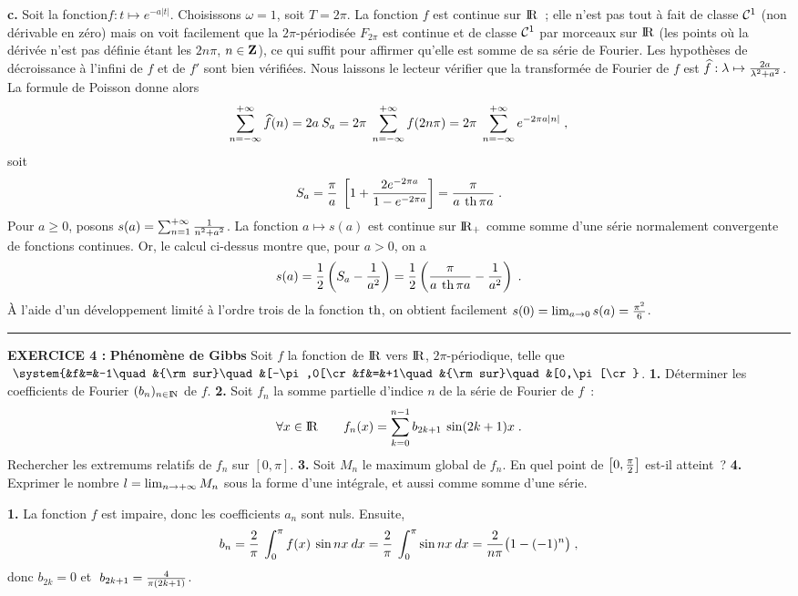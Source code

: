 \documentclass{article}
\begin{document}
\msk
{\bf c.} Soit la fonction$f:t\mapsto e^{-a|t|}$. Choisissons $\omega=1$,
soit $T=2\pi$. La fonction $f$ est continue sur ${\rm I\kern-0.6mm R}$~; elle
n'est pas tout \`a fait
de classe ${\cal C}^1$ (non d\'erivable en z\'ero) mais on voit facilement
que la $2\pi$-p\'eriodis\'ee $F_{2\pi}$ est continue et de classe ${\cal C}^1$
par morceaux sur ${\rm I\kern-0.6mm R}$ (les points o\`u la d\'eriv\'ee n'est pas d\'efinie \'etant
les $2n\pi$, $n\in\zmat$), ce qui suffit pour affirmer qu'elle est somme
de sa s\'erie de Fourier. Les hypoth\`eses de d\'ecroissance \`a l'infini de $f$
et de $f'$ sont bien v\'erifi\'ees. Nous laissons le lecteur v\'erifier que la transform\'ee de Fourier de $f$ est $\widehat{f}:\lambda\mapsto
{2a\over\lambda^2+a^2}$. La formule de Poisson donne alors\vv
$$\sum_{n=-\infty}^{+\infty}\widehat{f}(n)=2a\>S_a=2\pi\;\sum_{n=-\infty}^{+\infty}
  f(2n\pi)=2\pi\;\sum_{n=-\infty}^{+\infty}e^{-2\pi a|n|}\;,$$
soit\vv
$$S_a={\pi\over a}\;\left[1+{2e^{-2\pi a}\over1-e^{-2\pi a}}\right]=
  {\pi\over a\>\mathop{\rm th}\nolimits\pi a}\;.$$
Pour $a\ge0$, posons $s(a)=\sum_{n=1}^{+\infty}{1\over n^2+a^2}$. La fonction
$a\mapsto s(a)$ est continue sur ${\rm I\kern-0.6mm R}_+$ comme somme d'une s\'erie
normalement convergente de fonctions continues. Or, le calcul ci-dessus
montre que, pour $a>0$, on a\vv
$$s(a)={1\over2}\left( S_a-{1\over a^2}\right)={1\over2}\left({\pi\over a\>\mathop{\rm th}\nolimits\pi a}-{1\over a^2}\right)
  \;.$$
\`A l'aide d'un d\'eveloppement limit\'e \`a l'ordre trois de la fonction $\mathop{\rm th}\nolimits$,
on obtient facilement $s(0)=\lim_{a\rightarrow0}s(a)={\pi^2\over6}$.


\bsk\hrule\bsk

{\bf EXERCICE 4 :}\msk
{\bf Ph\'enom\`ene de Gibbs}\msk
Soit $f$ la fonction de ${\rm I\kern-0.6mm R}$ vers ${\rm I\kern-0.6mm R}$, $2\pi$-p\'eriodique, telle que $\;\system{&f&=&-1\quad&{\rm sur}\quad&[-\pi,0[\cr &f&=&+1\quad&{\rm sur}\quad&[0,\pi[\cr}$.
\msk
{\bf 1.} D\'eterminer les coefficients de Fourier $(b_n)_{n\in{\rm I\kern-0.5mm N}}$ de $f$.\msk
{\bf 2.} Soit $f_n$ la somme partielle d'indice $n$ de la s\'erie de Fourier de $f$~:\vv
$$\forall x\in{\rm I\kern-0.6mm R}\qquad f_n(x)=\sum_{k=0}^{n-1}b_{2k+1}\>\sin(2k+1)x\;.$$
Rechercher les extremums relatifs de $f_n$ sur $[0,\pi]$.\msk
{\bf 3.} Soit $M_n$ le maximum global de $f_n$. En quel point de $\left[0,{\pi\over2}\right]$ est-il atteint~?\msk
{\bf 4.} Exprimer le nombre $l=\lim_{n\rightarrow+\infty}M_n$ sous la forme d'une int\'egrale, et aussi comme somme d'une s\'erie.

\msk
\cl{- - - - - - - - - - - - - - - - - - - - - - - - - - - - - - - }
\msk

{\bf 1.} La fonction $f$ est impaire, donc les coefficients $a_n$ sont nuls. Ensuite,\vv
$$b_n  =  {2\over\pi}\>\int_0^{\pi}f(x)\>\sin nx\>dx={2\over\pi}\>\int_0^{\pi}\sin nx\>dx={2\over n\pi}\big(1-(-1)^n\big)\;,$$
donc $b_{2k}=0$ et $\;b_{2k+1}={4\over\pi(2k+1)}$.
\end{document}

